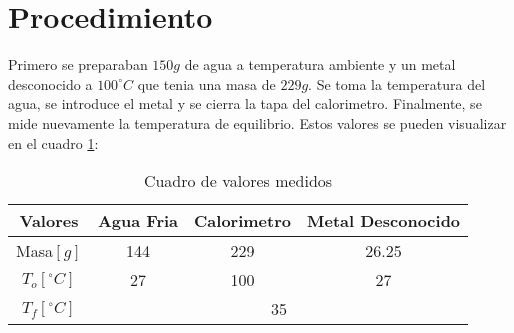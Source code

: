 \documentclass[12pt]{report}
\begin{document}
\section{Procedimiento}
Primero se preparaban $150 g$ de agua a temperatura ambiente y un metal desconocido a $100^\circ C$ que tenia una masa de $229 g$. Se toma la temperatura del agua, se introduce el metal y se cierra la tapa del calorimetro. Finalmente, se mide nuevamente la temperatura de equilibrio.
Estos valores se pueden visualizar en el cuadro \ref{table:data}:

\begin{table}[h!]
\centering
\begin{tabular}{|c|c|c|c|}
    \hline
    Valores & Agua Fria & Calorimetro & Metal Desconocido \\
    \hline
    Masa$[g]$ & 144 & 229 & 26.25 \\
    \hline
    $T_o [^\circ C]$ & 27 & 100 & 27 \\
    \hline
    $T_f [^\circ C]$ & \multicolumn{3}{|c|}{35}\\
    \hline
\end{tabular}
\caption{Cuadro de valores medidos}
\label{table:data}
\end{table}
\end{document}
